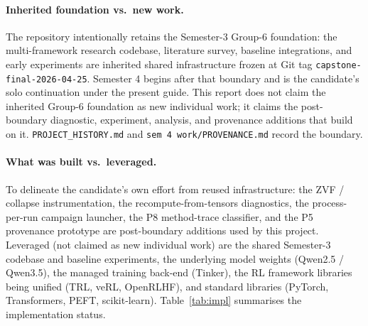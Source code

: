 \paragraph{Inherited foundation vs.\ new work.} The repository intentionally retains
the Semester-3 Group-6 foundation: the multi-framework research codebase, literature
survey, baseline integrations, and early experiments are inherited shared
infrastructure frozen at Git tag \texttt{capstone-final-2026-04-25}. Semester 4 begins
after that boundary and is the candidate's solo continuation under the present guide.
This report does not claim the inherited Group-6 foundation as new individual work;
it claims the post-boundary diagnostic, experiment, analysis, and provenance additions
that build on it. \texttt{PROJECT\_\-HISTORY.md} and \texttt{sem 4 work/\allowbreak PROVENANCE.md}
record the boundary.

\paragraph{What was built vs.\ leveraged.} To delineate the candidate's own effort from
reused infrastructure: the ZVF / collapse instrumentation, the
recompute-from-tensors diagnostics, the process-per-run campaign launcher, the P8
method-trace classifier, and the P5 provenance prototype are post-boundary additions
used by this project. Leveraged (not claimed as new individual work) are the shared
Semester-3 codebase and baseline experiments, the underlying model weights
(Qwen2.5 / Qwen3.5), the managed training back-end (Tinker), the RL framework libraries
being unified (TRL, veRL, OpenRLHF), and standard libraries (PyTorch, Transformers,
PEFT, scikit-learn). Table~\ref{tab:impl} summarises the implementation status.

